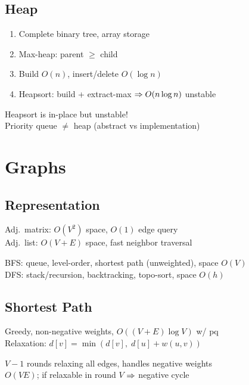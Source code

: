 \documentclass[lang=en,cols=4,paper=a4,fontsize=6.5pt,scheme=classic]{../cheatsheet}
\begin{document}
\subsection{Heap}
\begin{enumerate}
\item Complete binary tree, array storage
\item Max-heap: parent $\ge$ child
\item Build $O(n)$, insert/delete $O(\log n)$
\item Heapsort: build + extract-max $\Rightarrow O(n\log n)$ unstable
\end{enumerate}

\begin{warnbox}[Pitfall]
Heapsort is in-place but unstable!\\
Priority queue $\ne$ heap (abstract vs implementation)
\end{warnbox}

\section{Graphs}

\subsection{Representation}
Adj.\ matrix: $O(V^2)$ space, $O(1)$ edge query\\
Adj.\ list: $O(V+E)$ space, fast neighbor traversal

\begin{cmpbox}
BFS: queue, level-order, shortest path (unweighted), space $O(V)$\\
DFS: stack/recursion, backtracking, topo-sort, space $O(h)$
\end{cmpbox}

\subsection{Shortest Path}

\begin{thmbox}[Dijkstra]
Greedy, non-negative weights, $O((V+E)\log V)$ w/ pq\\
Relaxation: $d[v] = \min(d[v],\; d[u]+w(u,v))$
\end{thmbox}

\begin{thmbox}
$V-1$ rounds relaxing all edges, handles negative weights\\
$O(VE)$; if relaxable in round $V$ $\Rightarrow$ negative cycle
\end{thmbox}
\end{document}

